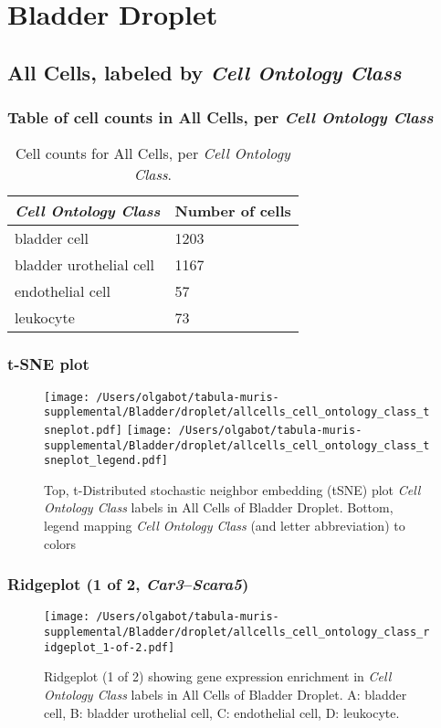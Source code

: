 \clearpage
\section{Bladder Droplet}

\subsection{All Cells, labeled by \emph{Cell Ontology Class}}
\subsubsection{Table of cell counts in All Cells, per \emph{Cell Ontology Class}}\begin{table}[h]
\centering
\label{my-label}
\begin{tabular}{@{}ll@{}}
\toprule

\emph{Cell Ontology Class}& Number of cells \\ \midrule
bladder cell & 1203 \\

bladder urothelial cell & 1167 \\

endothelial cell & 57 \\

leukocyte & 73 \\
\bottomrule
\end{tabular}
\caption{Cell counts for All Cells, per \emph{Cell Ontology Class}.}
\end{table}

\clearpage
\subsubsection{t-SNE plot}
\begin{figure}[h]
\centering
\texttt{[image: /Users/olgabot/tabula-muris-supplemental/Bladder/droplet/allcells\_cell\_ontology\_class\_tsneplot.pdf]}
\texttt{[image: /Users/olgabot/tabula-muris-supplemental/Bladder/droplet/allcells\_cell\_ontology\_class\_tsneplot\_legend.pdf]}
\caption{Top, t-Distributed stochastic neighbor embedding (tSNE) plot  \emph{Cell Ontology Class} labels in All Cells of Bladder Droplet. Bottom, legend mapping \emph{Cell Ontology Class} (and letter abbreviation) to colors}
\end{figure}


\clearpage

\subsubsection{Ridgeplot (1 of 2, \emph{Car3}--\emph{Scara5})}
\begin{figure}[h]
\centering
\texttt{[image: /Users/olgabot/tabula-muris-supplemental/Bladder/droplet/allcells\_cell\_ontology\_class\_ridgeplot\_1-of-2.pdf]}

\caption{ Ridgeplot (1 of 2)  showing gene expression enrichment in \emph{Cell Ontology Class} labels in All Cells of Bladder Droplet. A: bladder cell, B: bladder urothelial cell, C: endothelial cell, D: leukocyte.}
\end{figure}


